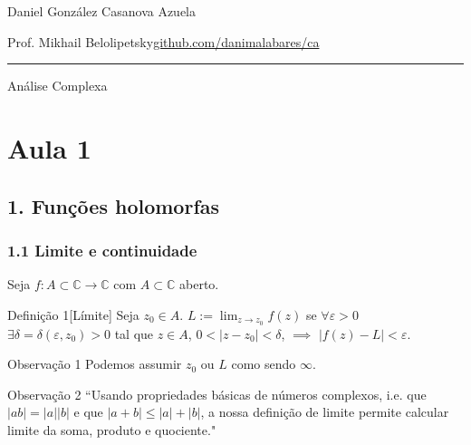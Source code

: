 
\newcommand{\rightlooparrow}{\mathbin{
    \vbox{\openup-10.25pt\halign{\hss$##$\hss\cr\circ\cr\longrightarrow\cr}}
}}




\begin{minipage}{\textwidth}
	\begin{minipage}{1\textwidth}
		\hfill Daniel González Casanova Azuela
		
		{\small Prof. Mikhail Belolipetsky\hfill\href{https://github.com/danimalabares/ca}{github.com/danimalabares/ca}}
	\end{minipage}
\end{minipage}\vspace{.2cm}\hrule

\vspace{10pt}
{\huge Análise Complexa}
\tableofcontents
\section{Aula 1}

\subsection{1. Funções holomorfas}

\subsubsection{1.1 Limite e continuidade}

Seja \(f:A \subset \mathbb{C} \to \mathbb{C}\) com \(A \subset \mathbb{C}\) aberto.

\begin{thing4}{Definição 1}[Límite]\label{def:1}\leavevmode
	Seja \(z_0 \in A\). \(L:=\lim_{z \to z_0} f(z)\) se \(\forall  \varepsilon>0\) \(\exists \delta=\delta(\varepsilon,z_0)>0\) tal que \(z \in A\), \(0 <|z-z_0|<\delta\), \(\implies\) \(|f(z)-L|<\varepsilon\).
\end{thing4}
\begin{thing5}{Observação 1}\label{rk:1}\leavevmode
 Podemos assumir \(z_0\) ou \(L\) como sendo \(\infty\).
\end{thing5}
\begin{thing5}{Observação 2}\label{rk:2}\leavevmode
``Usando propriedades básicas de números complexos, i.e. que \(|ab|=|a||b|\) e que \(|a+b|\leq |a|+|b|\), a nossa definição de limite permite calcular limite da soma, produto e quociente."
\end{thing5}

